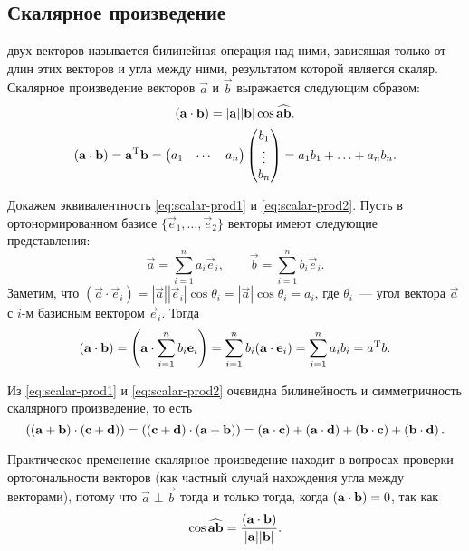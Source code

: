 \subsection{Скалярное произведение}
 двух векторов называется билинейная операция над ними, зависящая только от длин этих векторов и угла между ними, результатом которой является скаляр. Скалярное произведение векторов $\vec{a}$ и  $\vec{b}$ выражается следующим образом:
\begin{equation}
	\left(\mathbf{a} \cdot \mathbf{b}\right) = |\mathbf{a}||\mathbf{b}| \cos \widehat{\mathbf{a}\mathbf{b}}. \label{eq:scalar-prod1}
\end{equation}
\begin{equation}
	\left(\mathbf{a} \cdot \mathbf{b}\right) = \mathbf{a}^{\operatorname{T}} \mathbf{b} =
	\begin{pmatrix}
		a_1 & \cdots & a_n
	\end{pmatrix}
	\begin{pmatrix}
		b_1\\
		\vdots\\
		b_n
	\end{pmatrix}
	= a_1 b_1 + \ldots + a_n b_n.
	\label{eq:scalar-prod2}
\end{equation}

Докажем эквивалентность \eqref{eq:scalar-prod1} и \eqref{eq:scalar-prod2}. Пусть в ортонормированном базисе $\{\vec{e}_1, \ldots, \vec{e}_2\}$ векторы имеют следующие представления:
\begin{equation}
	\vec{a} = \sum\limits_{i = 1}^n a_i \vec{e}_i, \qquad \vec{b} = \sum\limits_{i = 1}^n b_i \vec{e}_i.
\end{equation}
Заметим, что $(\vec{a} \cdot \vec{e}_i) = |\vec{a}||\vec{e}_i| \cos \theta_i = |\vec{a}| \cos \theta_i = a_i$, где $\theta_i$~--- угол вектора $\vec{a}$ с $i$-м базисным вектором $\vec{e}_i$. Тогда
\begin{equation}
	\left(\mathbf{a} \cdot \mathbf{b}\right) = \left( \mathbf{a} \cdot \sum\limits_{i=1}^n b_i\mathbf{e}_i \right) = \sum\limits_{i=1}^n b_i(\mathbf{a} \cdot \mathbf{e}_i) = \sum\limits_{i=1}^n a_i b_i = a^{\operatorname{T}}b.
\end{equation}

Из \eqref{eq:scalar-prod1} и \eqref{eq:scalar-prod2} очевидна билинейность и симметричность скалярного произведение, то есть
\begin{equation}
	\left(\mathbf{(a + b)} \cdot \mathbf{(c + d)}\right) = \left(\mathbf{(c + d)} \cdot \mathbf{(a + b)}\right) = \left(\mathbf{a} \cdot \mathbf{c}\right) + \left(\mathbf{a} \cdot \mathbf{d}\right) + \left(\mathbf{b} \cdot \mathbf{c}\right) + \left(\mathbf{b} \cdot \mathbf{d}\right).
\end{equation}

Практическое пременение скалярное произведение находит в вопросах проверки ортогональности векторов (как частный случай нахождения угла между векторами), потому что $\vec{a} \perp \vec{b}$ тогда и только тогда, когда $\left(\mathbf{a} \cdot \mathbf{b}\right) = 0$, так как
\begin{equation}
	\cos \widehat{\mathbf{a}\mathbf{b}} = \frac{\left(\mathbf{a} \cdot \mathbf{b}\right)}{|\mathbf{a}||\mathbf{b}|}.
\end{equation}

